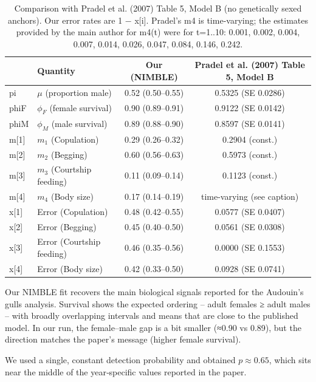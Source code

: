\documentclass[
  12pt,
]{krantz}
\begin{document}
\begin{table}

\caption{\label{tab:unnamed-chunk-378}Comparison with Pradel et al. (2007) Table 5, Model B (no genetically sexed anchors). Our error rates are 1 − x[i]. Pradel's m4 is time-varying; the estimates provided by the main author for m4(t) were for t=1..10: 0.001, 0.002, 0.004, 0.007, 0.014, 0.026, 0.047, 0.084, 0.146, 0.242.}
\centering
\begin{tabular}[t]{l|l|c|c}
\hline
  & Quantity & Our (NIMBLE) & Pradel et al. (2007) Table 5, Model B\\
\hline
pi & $\mu$ (proportion male) & 0.52 (0.50–0.55) & 0.5325 (SE 0.0286)\\
\hline
phiF & $\phi_F$ (female survival) & 0.90 (0.89–0.91) & 0.9122 (SE 0.0142)\\
\hline
phiM & $\phi_M$ (male survival) & 0.89 (0.88–0.90) & 0.8597 (SE 0.0141)\\
\hline
m[1] & $m_1$ (Copulation) & 0.29 (0.26–0.32) & 0.2904 (const.)\\
\hline
m[2] & $m_2$ (Begging) & 0.60 (0.56–0.63) & 0.5973 (const.)\\
\hline
m[3] & $m_3$ (Courtship feeding) & 0.11 (0.09–0.14) & 0.1123 (const.)\\
\hline
m[4] & $m_4$ (Body size) & 0.17 (0.14–0.19) & time-varying (see caption)\\
\hline
x[1] & Error (Copulation) & 0.48 (0.42–0.55) & 0.0577 (SE 0.0407)\\
\hline
x[2] & Error (Begging) & 0.45 (0.40–0.50) & 0.0561 (SE 0.0308)\\
\hline
x[3] & Error (Courtship feeding) & 0.46 (0.35–0.56) & 0.0000 (SE 0.1553)\\
\hline
x[4] & Error (Body size) & 0.42 (0.33–0.50) & 0.0928 (SE 0.0741)\\
\hline
\end{tabular}
\end{table}

Our NIMBLE fit recovers the main biological signals reported for the Audouin's gulls analysis. Survival shows the expected ordering -- adult females ≥ adult males -- with broadly overlapping intervals and means that are close to the published model. In our run, the female--male gap is a bit smaller (≈0.90 vs 0.89), but the direction matches the paper's message (higher female survival).

We used a single, constant detection probability and obtained \(p≈0.65\), which sits near the middle of the year‐specific values reported in the paper.
\end{document}
